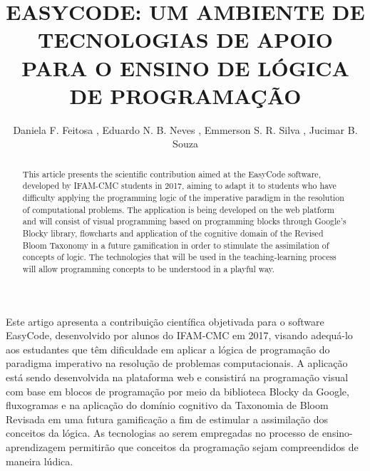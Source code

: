 \documentclass[12pt]{article}
\title{EASYCODE: UM AMBIENTE DE TECNOLOGIAS DE APOIO PARA O ENSINO DE LÓGICA DE PROGRAMAÇÃO}
\author{Daniela F. Feitosa \inst{1}, Eduardo N. B. Neves \inst{1}, Emmerson S. R. Silva \inst{1}, Jucimar B. Souza \inst{1}}
\begin{document}
 

\maketitle

\begin{abstract}
This article presents the scientific contribution aimed at the EasyCode software, developed by IFAM-CMC students in 2017, aiming to adapt it to students who have difficulty applying the programming logic of the imperative paradigm in the resolution of computational problems. The application is being developed on the web platform and will consist of visual programming based on programming blocks through Google's Blocky library, flowcharts and application of the cognitive domain of the Revised Bloom Taxonomy \cite{ANDERSON:2001} in a future gamification in order to stimulate the assimilation of concepts of logic. The technologies that will be used in the teaching-learning process will allow programming concepts to be understood in a playful way.

\end{abstract}
     
\begin{resumo}
Este artigo apresenta a contribuição científica objetivada para o software EasyCode, desenvolvido por alunos do IFAM-CMC em 2017, visando adequá-lo aos estudantes que têm dificuldade em aplicar a lógica de programação do paradigma imperativo na resolução de problemas computacionais. A aplicação está sendo desenvolvida na plataforma web e consistirá na programação visual com base em blocos de programação por meio da biblioteca Blocky da Google, fluxogramas e na aplicação do domínio cognitivo da Taxonomia de Bloom Revisada \cite{ANDERSON:2001} em uma futura gamificação a fim de estimular a assimilação dos conceitos da lógica. As tecnologias ao serem empregadas no processo de ensino-aprendizagem permitirão que conceitos da programação sejam compreendidos de maneira lúdica.
\end{resumo}
\end{document}
